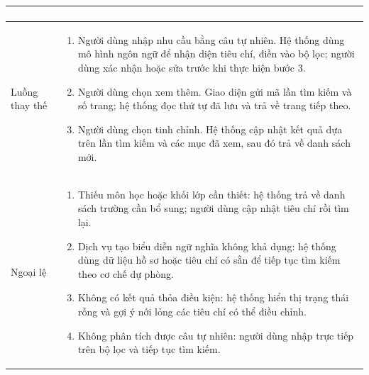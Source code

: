 \begin{longtable}{|p{}|p{}|}
\begin{enumerate}[leftmargin=*,nosep]
\end{enumerate} \\ \hline
Luồng thay thế &
\begin{enumerate}[leftmargin=*,nosep]
  \item[2a.] Người dùng nhập nhu cầu bằng câu tự nhiên. Hệ thống dùng mô hình ngôn ngữ để nhận diện tiêu chí, điền vào bộ lọc; người dùng xác nhận hoặc sửa trước khi thực hiện bước 3.
  \item[7a.] Người dùng chọn xem thêm. Giao diện gửi mã lần tìm kiếm và số trang; hệ thống đọc thứ tự đã lưu và trả về trang tiếp theo.
  \item[7b.] Người dùng chọn tinh chỉnh. Hệ thống cập nhật kết quả dựa trên lần tìm kiếm và các mục đã xem, sau đó trả về danh sách mới.
\end{enumerate} \\ \hline
Ngoại lệ &
\begin{enumerate}[leftmargin=*,nosep]
  \item[4a.] Thiếu môn học hoặc khối lớp cần thiết: hệ thống trả về danh sách trường cần bổ sung; người dùng cập nhật tiêu chí rồi tìm lại.
  \item[4b.] Dịch vụ tạo biểu diễn ngữ nghĩa không khả dụng: hệ thống dùng dữ liệu hồ sơ hoặc tiêu chí có sẵn để tiếp tục tìm kiếm theo cơ chế dự phòng.
  \item[5a.] Không có kết quả thỏa điều kiện: hệ thống hiển thị trạng thái rỗng và gợi ý nới lỏng các tiêu chí có thể điều chỉnh.
  \item[2b.] Không phân tích được câu tự nhiên: người dùng nhập trực tiếp trên bộ lọc và tiếp tục tìm kiếm.
\end{enumerate} \\ \hline
\end{longtable}
